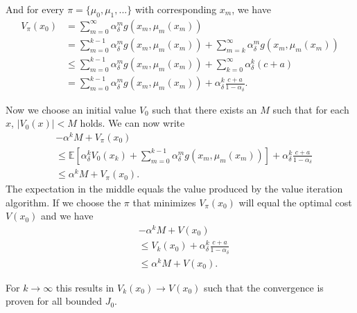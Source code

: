 And for every $\pi=\{\mu_0,\mu_1,...\}$ with corresponding $x_m$, we have
\begin{equation}
\begin{split}
V_\pi(x_0)&=\sum\limits_{m=0}^{\infty}\alpha_\delta^mg(x_m,\mu_m(x_m))\\
&=\sum\limits_{m=0}^{k-1}\alpha_\delta^mg(x_m,\mu_m(x_m))+\sum\limits_{m=k}^{\infty}\alpha_\delta^mg(x_m,\mu_m(x_m))\\
&\leq \sum\limits_{m=0}^{k-1}\alpha_\delta^mg(x_m,\mu_m(x_m))+\sum\limits_{k=0}^\infty\alpha_\delta^k(c+a)\\
&=\sum\limits_{m=0}^{k-1}\alpha_\delta^mg(x_m,\mu_m(x_m))+\alpha_\delta^k\frac{c+a}{1-\alpha_\delta}.
\end{split}
\end{equation}

Now we choose an initial value $V_0$ such that there exists an $M$ such that for each $x$, $|V_0(x)|<M$ holds.
We can now write
\begin{equation}
\begin{split}
&-\alpha^k M + V_\pi(x_0)\\
&\leq\mathbb{E}[\alpha_\delta^k V_0(x_k)+\sum\limits_{m=0}^{k-1}\alpha_\delta^mg(x_m,\mu_m(x_m))]+\alpha_\delta^k\frac{c+a}{1-\alpha_\delta}\\
&\leq \alpha^k M + V_\pi(x_0).
\end{split}
\end{equation}
The expectation in the middle equals the value produced by the value iteration algorithm.
If we choose the $\pi$ that minimizes $V_\pi(x_0)$ will equal the optimal cost $V(x_0)$ and we have
\begin{equation}
\begin{split}
&-\alpha^k M + V(x_0)\\
&\leq V_k(x_0)+\alpha_\delta^k\frac{c+a}{1-\alpha_\delta}\\
&\leq \alpha^k M + V(x_0).
\end{split}
\end{equation}

For $k\rightarrow \infty$ this results in $V_k(x_0)\rightarrow V(x_0)$ such that the convergence is proven for all bounded $J_0$.